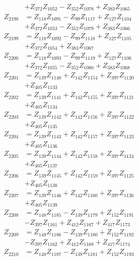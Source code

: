 \begin{multicols}{2}
\begin{align}
&+ Z_{372}Z_{1052} - Z_{352}Z_{1078} + Z_{383}Z_{1065} \nonumber \\
Z_{2198} &= Z_{118}Z_{1091} - Z_{99}Z_{1117} + Z_{127}Z_{1104}  \nonumber \\
&+ Z_{372}Z_{1053} - Z_{352}Z_{1079} + Z_{383}Z_{1066} \nonumber \\
Z_{2199} &= Z_{118}Z_{1092} - Z_{99}Z_{1118} + Z_{127}Z_{1105}  \nonumber \\
&+ Z_{372}Z_{1054} + Z_{383}Z_{1067} \nonumber \\
Z_{2200} &= Z_{118}Z_{1093} - Z_{99}Z_{1119} + Z_{127}Z_{1106}  \nonumber \\
&+ Z_{372}Z_{1055} - Z_{352}Z_{1080} + Z_{383}Z_{1068} \nonumber \\
Z_{2201} &= Z_{139}Z_{1140} + Z_{142}Z_{1154} + Z_{397}Z_{1120}  \nonumber \\
&+ Z_{405}Z_{1133} \nonumber \\
Z_{2202} &= Z_{139}Z_{1141} + Z_{142}Z_{1155} + Z_{397}Z_{1121}  \nonumber \\
&+ Z_{405}Z_{1134} \nonumber \\
Z_{2203} &= Z_{139}Z_{1142} + Z_{142}Z_{1156} + Z_{397}Z_{1122}  \nonumber \\
&+ Z_{405}Z_{1135} \nonumber \\
Z_{2204} &= Z_{139}Z_{1143} + Z_{142}Z_{1157} + Z_{397}Z_{1123}  \nonumber \\
&+ Z_{405}Z_{1136} \nonumber \\
Z_{2205} &= Z_{139}Z_{1144} + Z_{142}Z_{1158} + Z_{397}Z_{1124}  \nonumber \\
&+ Z_{405}Z_{1137} \nonumber \\
Z_{2206} &= Z_{139}Z_{1145} + Z_{142}Z_{1159} + Z_{397}Z_{1125}  \nonumber \\
&+ Z_{405}Z_{1138} \nonumber \\
Z_{2207} &= Z_{139}Z_{1146} + Z_{142}Z_{1160} + Z_{397}Z_{1126}  \nonumber \\
&+ Z_{405}Z_{1139} \nonumber \\
Z_{2208} &= Z_{148}Z_{1185} - Z_{139}Z_{1179} + Z_{152}Z_{1191}  \nonumber \\
&- Z_{397}Z_{1161} + Z_{412}Z_{1167} + Z_{417}Z_{1173} \nonumber \\
Z_{2209} &= Z_{148}Z_{1186} - Z_{139}Z_{1180} + Z_{152}Z_{1192}  \nonumber \\
&- Z_{397}Z_{1162} + Z_{412}Z_{1168} + Z_{417}Z_{1174} \nonumber \\
Z_{2210} &= Z_{148}Z_{1187} - Z_{139}Z_{1181} + Z_{152}Z_{1193}  \nonumber \\

\end{align}
\end{multicols}
